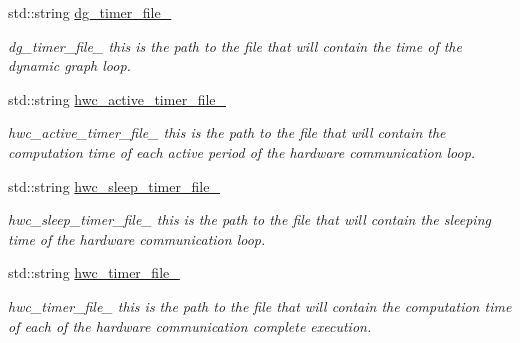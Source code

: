 \begin{DoxyCompactItemize}
std\+::string \hyperlink{classdynamic__graph_1_1DynamicGraphManager_a1a43bcf9c74648466d1e561203a39d87}{dg\+\_\+timer\+\_\+file\+\_\+}
\begin{DoxyCompactList}\small\item\em dg\+\_\+timer\+\_\+file\+\_\+ this is the path to the file that will contain the time of the dynamic graph loop. \end{DoxyCompactList}\item 
\mbox{\label{classdynamic__graph_1_1DynamicGraphManager_a2bd29dbd358b8c02805f4df970e75936}} 
std\+::string \hyperlink{classdynamic__graph_1_1DynamicGraphManager_a2bd29dbd358b8c02805f4df970e75936}{hwc\+\_\+active\+\_\+timer\+\_\+file\+\_\+}
\begin{DoxyCompactList}\small\item\em hwc\+\_\+active\+\_\+timer\+\_\+file\+\_\+ this is the path to the file that will contain the computation time of each active period of the hardware communication loop. \end{DoxyCompactList}\item 
\mbox{\label{classdynamic__graph_1_1DynamicGraphManager_a5db6275d202963665a35c5eb2e68088d}} 
std\+::string \hyperlink{classdynamic__graph_1_1DynamicGraphManager_a5db6275d202963665a35c5eb2e68088d}{hwc\+\_\+sleep\+\_\+timer\+\_\+file\+\_\+}
\begin{DoxyCompactList}\small\item\em hwc\+\_\+sleep\+\_\+timer\+\_\+file\+\_\+ this is the path to the file that will contain the sleeping time of the hardware communication loop. \end{DoxyCompactList}\item 
\mbox{\label{classdynamic__graph_1_1DynamicGraphManager_a84f97c9eebbecee1af314e74fe22d8ed}} 
std\+::string \hyperlink{classdynamic__graph_1_1DynamicGraphManager_a84f97c9eebbecee1af314e74fe22d8ed}{hwc\+\_\+timer\+\_\+file\+\_\+}
\begin{DoxyCompactList}\small\item\em hwc\+\_\+timer\+\_\+file\+\_\+ this is the path to the file that will contain the computation time of each of the hardware communication complete execution. \end{DoxyCompactList}\item 
\mbox{\label{classdynamic__graph_1_1DynamicGraphManager_ace11054bf618c29e4fda9a77905e8ff0}} 

\end{DoxyCompactItemize}
